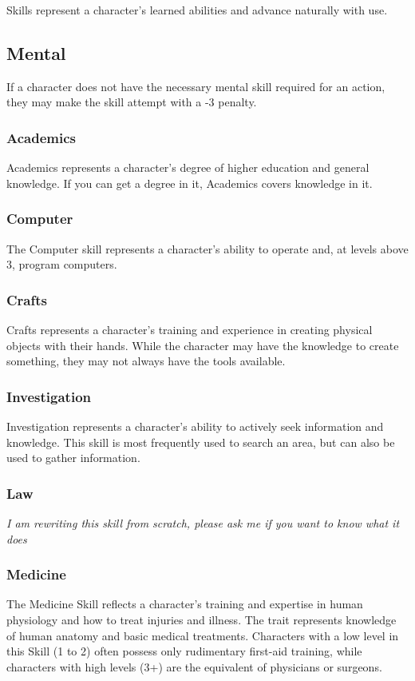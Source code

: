 \documentclass["../Misguided by Starlight.tex"]{subfiles}
\begin{document}
Skills represent a character's learned abilities and advance naturally with use.

\subsection{Mental}
If a character does not have the necessary mental skill required for an action, they may make the skill attempt with a -3 penalty.

\subsubsection{Academics}
Academics represents a character's degree of higher education and general knowledge. If you can get a degree in it, Academics covers knowledge in it.

\subsubsection{Computer}
The Computer skill represents a character's ability to operate and, at levels above 3, program computers.

\subsubsection{Crafts}
Crafts represents a character's training and experience in creating physical objects with their hands. While the character may have the knowledge to create something, they may not always have the tools available.

\subsubsection{Investigation}
Investigation represents a character's ability to actively seek information and knowledge. This skill is most frequently used to search an area, but can also be used to gather information.

\subsubsection{Law}
\emph{I am rewriting this skill from scratch, please ask me if you want to know what it does}

\subsubsection{Medicine}
The Medicine Skill reflects a character’s training and expertise in human physiology and how to treat injuries and illness. The trait represents knowledge of human anatomy and basic medical treatments. Characters with a low level in this Skill (1 to 2) often possess only rudimentary first-aid training, while characters with high levels (3+) are the equivalent of physicians or surgeons.
\end{document}
